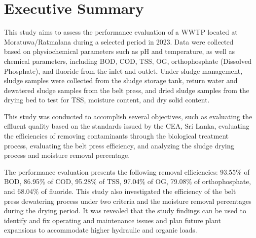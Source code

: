 \newpage
\section*{\centering Executive Summary}


This study aims to assess the performance evaluation of a \ac{WWTP} located at Moratuwa/Ratmalana during a selected period in 2023. Data were collected based on physiochemical parameters such as pH and temperature, as well as chemical parameters, including \ac{BOD}, \ac{COD}, \ac{TSS}, \ac{OG}, orthophosphate (Dissolved Phosphate), and fluoride from the inlet and outlet. Under sludge management, sludge samples were collected from the sludge storage tank, return water and dewatered sludge samples from the belt press, and dried sludge samples from the drying bed to test for \ac{TSS}, moisture content, and dry solid content.

This study was conducted to accomplish several objectives, such as evaluating the effluent quality based on the standards issued by the \ac{CEA}, Sri Lanka, evaluating the efficiencies of removing contaminants through the biological treatment process, evaluating the belt press efficiency, and analyzing the sludge drying process and moisture removal percentage.

The performance evaluation presents the following removal efficiencies: 93.55\% of \ac{BOD}, 86.95\% of \ac{COD}, 95.28\% of \ac{TSS}, 97.04\% of \ac{OG}, 79.08\% of orthophosphate, and 68.04\% of fluoride.  This study also investigated the efficiency of the belt press dewatering process under two criteria and the moisture removal percentages during the drying period.  It was revealed that the study findings can be used to identify and fix operating and maintenance issues and plan future plant expansions to accommodate higher hydraulic and organic loads.
